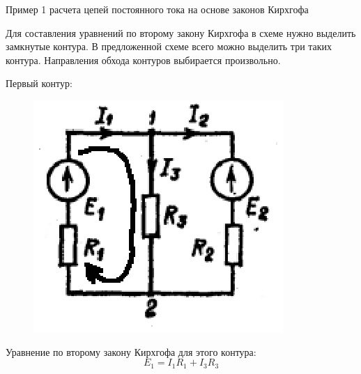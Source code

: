 \documentclass[10pt, pdf, hyperref={unicode},handout]{beamer}
\begin{document}
\begin{frame}{Пример 1  расчета цепей постоянного тока на основе законов Кирхгофа}
  \begin{block}

    \small{
      Для составления уравнений по второму закону Кирхгофа в схеме нужно выделить замкнутые контура. В предложенной схеме всего можно выделить три таких контура. Направления обхода контуров выбирается произвольно.

      Первый контур:
\begin{figure}[htb] 
    \centering
    \includegraphics [scale=1.3]{ris3.eps}
  \end{figure}
  Уравнение по второму закону Кирхгофа для этого контура: $$E_1=I_1R_1+I_3R_3$$
      
}

  \end{block}
  
\end{frame}
\end{document}
